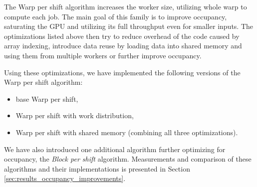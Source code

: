 The Warp per shift algorithm increases the worker size, utilizing whole warp to compute each job. The main goal of this family is to improve occupancy, saturating the GPU and utilizing its full throughput even for smaller inputs. The optimizations listed above then try to reduce overhead of the code caused by array indexing, introduce data reuse by loading data into shared memory and using them from multiple workers or further improve occupancy.

Using these optimizations, we have implemented the following versions of the Warp per shift algorithm:
\begin{itemize}
	\item base Warp per shift,
	\item Warp per shift with work distribution,
	\item Warp per shift with shared memory (combining all three optimizations).
\end{itemize}
	
We have also introduced one additional algorithm further optimizing for occupancy, the \textit{Block per shift} algorithm. 	Measurements and comparison of these algorithms and their implementations is presented in Section \ref{sec:results_occupancy_improvements}.





